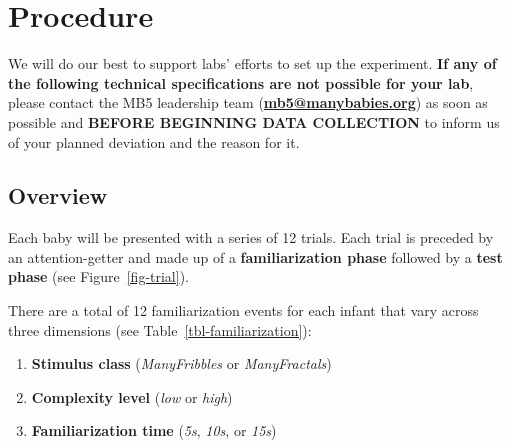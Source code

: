 \documentclass[
  letterpaper,
  DIV=11,
  numbers=noendperiod,
  oneside]{scrreprt}
\providecommand{\tightlist}{%
  \setlength{\itemsep}{0pt}\setlength{\parskip}{0pt}}
\begin{document}

\chapter{Procedure}\label{sec-procedure}

\begin{tcolorbox}[enhanced jigsaw, coltitle=black, colframe=quarto-callout-important-color-frame, titlerule=0mm, colback=white, arc=.35mm, toprule=.15mm, left=2mm, colbacktitle=quarto-callout-important-color!10!white, opacityback=0, bottomtitle=1mm, title=\textcolor{quarto-callout-important-color}{\faExclamation}\hspace{0.5em}{LABS SHOULD ADHERE TO THESE SPECIFICATIONS AS CLOSELY AS POSSIBLE}, breakable, rightrule=.15mm, opacitybacktitle=0.6, toptitle=1mm, leftrule=.75mm, bottomrule=.15mm]

We will do our best to support labs' efforts to set up the experiment.
\textbf{If any of the following technical specifications are not
possible for your lab}, please contact the MB5 leadership team
(\href{mailto:mb5@manybabies.org}{\textbf{mb5@manybabies.org}}) as soon
as possible and \textbf{BEFORE BEGINNING DATA COLLECTION} to inform us
of your planned deviation and the reason for it.

\end{tcolorbox}

\section{Overview}\label{overview-3}

Each baby will be presented with a series of 12 trials. Each trial is
preceded by an attention-getter and made up of a \textbf{familiarization
phase} followed by a \textbf{test phase} (see Figure~\ref{fig-trial}).

There are a total of 12 familiarization events for each infant that vary
across three dimensions (see Table~\ref{tbl-familiarization}):

\begin{enumerate}
\def\labelenumi{\arabic{enumi}.}
\tightlist
\item
  \textbf{Stimulus class} (\emph{ManyFribbles} or \emph{ManyFractals})
\item
  \textbf{Complexity level} (\emph{low} or \emph{high})
\item
  \textbf{Familiarization time} (\emph{5s}, \emph{10s}, or \emph{15s})
\end{enumerate}
\end{document}
